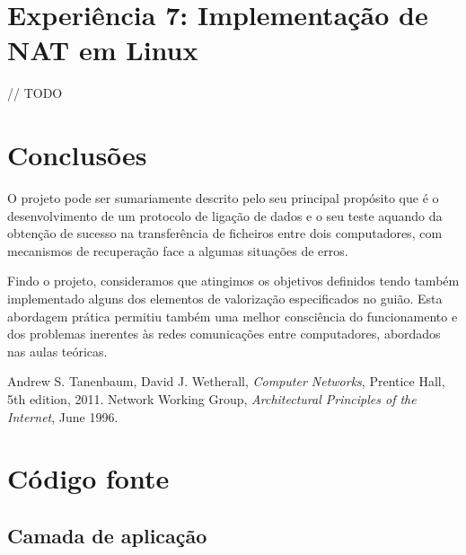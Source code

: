 \documentclass[a4paper,11pt,titlepage]{article}
\begin{document}
\section{Experiência 7: Implementação de NAT em Linux }

// TODO

\section{Conclusões}

O projeto pode ser sumariamente descrito pelo seu principal propósito que é o
desenvolvimento de um protocolo de ligação de dados e o seu teste aquando da
obtenção de sucesso na transferência de ficheiros entre dois computadores, com
mecanismos de recuperação face a algumas situações de erros. 


Findo o projeto, consideramos que atingimos os objetivos definidos tendo também
implementado alguns dos elementos de valorização especificados no guião. Esta
abordagem prática permitiu também uma melhor consciência do funcionamento e dos
problemas inerentes às redes comunicações entre computadores, abordados nas
aulas teóricas.

\begin{thebibliography}{9}
  Andrew S. Tanenbaum,
  David J. Wetherall,
  \emph{Computer Networks},
  Prentice Hall, 
  5th edition,
  2011.
  Network Working Group,
  \emph{Architectural Principles of the Internet},
  June 1996.
\end{thebibliography}

\appendix
\section{Código fonte}
\subsection{Camada de aplicação}
\end{document}
